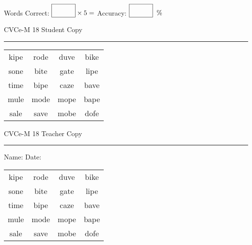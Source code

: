 \documentclass{memoir}
\begin{document}
\small

Words Correct: $\fbox{\phantom{\huge 100}} \times 5 = $ Accuracy: $\fbox{\phantom{\huge 100}}\;\; \%$ 

\vfill

\newpage


\footnotesize \noindent
CVCe-M 18 \hfill Student Copy
\smallskip
\hrule

\Large

\setlength{\tabcolsep}{14pt}
\def\arraystretch{2}

{\selectfont


\begin{vplace}[0.5]
\begin{center}
\begin{tabular}{cccc}
kipe & rode & duve & bike \\
sone & bite & gate & lipe \\
time & bipe & caze & bave \\
mule & mode & mope & bape \\
sale & save & mobe & dofe \\
\end{tabular}
\end{center}
\end{vplace}

}

\newpage

\footnotesize \noindent
CVCe-M 18 \hfill Teacher Copy
\smallskip
\hrule

\small

\vfill

\noindent
Name: \underline{\hspace{1.75in}} \hfill Date: \underline{\hspace{1in}}

\Large

{\selectfont


\begin{vplace}[0.5]
\begin{center}
\begin{tabular}{cccc}
kipe & rode & duve & bike \\
sone & bite & gate & lipe \\
time & bipe & caze & bave \\
mule & mode & mope & bape \\
sale & save & mobe & dofe \\
\end{tabular}
\end{center}
\end{vplace}



}
\end{document}
